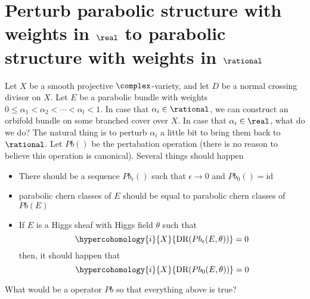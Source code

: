\documentclass{article}
\begin{document}
 


\section{Perturb parabolic structure with weights in $\real$ to parabolic structure with weights in 
$\rational$}
Let $X$ be a smooth projective $\complex$-variety, and let $D$ be a normal crossing divisor on $X$.
Let $E$ be a parabolic bundle with weights $0 \leq \alpha_1 < \alpha_2 < \cdots < \alpha_l <1$. 
In case that $\alpha_i \in \rational$, we can construct an orbifold bundle on some branched cover over $X$.
In case that $\alpha_i \in \real$, what do we do? The natural thing is to perturb $\alpha_i$ a little bit
to bring them back to $\rational$. Let $Pb()$ be the pertabation operation (there is no reason to believe 
this operation is canonical). Several things should happen\newline
\begin{itemize}
\item There should be a sequence $Pb_{\epsilon}()$ such that $\epsilon \rightarrow 0$ and
    $Pb_0() = \text{id}$
\item parabolic chern classes of $E$ should be equal to parabolic chern classes of $Pb(E)$
\item If $E$ is a Higgs sheaf with Higgs field $\theta$ such that 
    \[
        \hypercohomology{i}{X}{\text{DR}(Pb_{\epsilon}(E, \theta))} = 0
    \]
    then, it should happen that
    \[
        \hypercohomology{i}{X}{\text{DR}(Pb_{0}(E, \theta))} = 0
    \]
\end{itemize}
\begin{question}
What would be a operator $Pb$ so that everything above is true?
\end{question}
\end{document}
